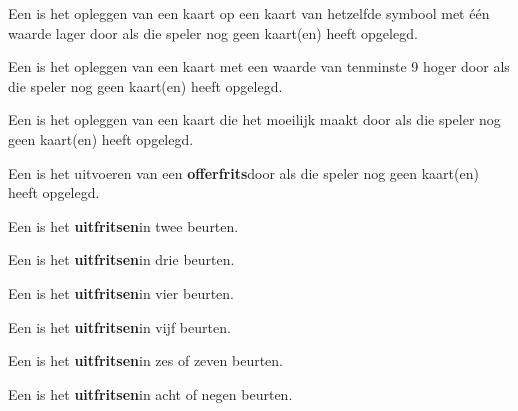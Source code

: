 \item Een  is het opleggen van een kaart op een kaart van hetzelfde symbool met \'e\'en waarde lager door \Willem als die speler nog geen kaart(en) heeft opgelegd.

\item Een  is het opleggen van een kaart met een waarde van tenminste 9 hoger door \Willem als die speler nog geen kaart(en) heeft opgelegd.

\item Een  is het opleggen van een kaart die het \andereSpelers moeilijk maakt door \Willem als die speler nog geen kaart(en) heeft opgelegd.

\item Een  is het uitvoeren van een \textbf{offerfrits}\footnotemark[3] door \Willem als die speler nog geen kaart(en) heeft opgelegd.

\item Een  is het \textbf{uitfritsen}\footnotemark[3] in twee beurten\footnotemark[4].

\item Een  is het \textbf{uitfritsen}\footnotemark[3] in drie beurten\footnotemark[4].

\item Een  is het \textbf{uitfritsen}\footnotemark[3] in vier beurten\footnotemark[4].

\item Een  is het \textbf{uitfritsen}\footnotemark[3] in vijf beurten\footnotemark[4].

\item Een  is het \textbf{uitfritsen}\footnotemark[3] in zes of zeven beurten.

\item Een  is het \textbf{uitfritsen}\footnotemark[3] in acht of negen beurten.
\eindABCLijst


